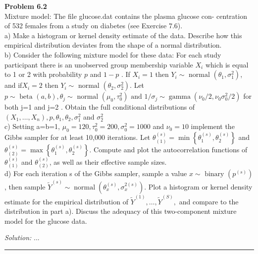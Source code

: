 \documentclass[a4paper, 11pt]{article}
\newenvironment{problem}[2][Problem]
    { \begin{mdframed}[backgroundcolor=gray!20] \textbf{#1 #2} \\}
    {  \end{mdframed}}
\newenvironment{solution}
    {\textit{Solution:}}
    {}
\begin{document}
\begin{problem}{6.2}
  Mixture model: The file glucose.dat contains the plasma glucose con- centration of 532 females from a study on diabetes (see Exercise 7.6).\\
  a) Make a histogram or kernel density estimate of the data. Describe how this empirical distribution deviates from the shape of a normal distribution.\\
  b) Consider the following mixture model for these data: For each study  participant there is an unobserved group membership variable $ X_{i}$   which is equal to  1  or  2 with probability $ p$ and $ 1-p$ . If $ X_{i}=1 $ then $ Y_{i} \sim \text { normal }\left(\theta_{1}, \sigma_{1}^{2}\right)$, and if$ X_{i}=2$  then $ Y_{i} \sim \text { normal }\left(\theta_{2}, \sigma_{2}^{2}\right) $. Let $  p \sim \text { beta }(a, b), \theta_{j} \sim \text { normal }\left(\mu_{0}, \tau_{0}^{2}\right) \text { and } 1 / \sigma_{j} \sim \operatorname{gamma}\left(\nu_{0} / 2, \nu_{0} \sigma_{0}^{2} / 2\right) $ for both  j=1 and  j=2 . Obtain the full conditional distributions of$ \left(X_{1}, \ldots, X_{n}\right), p, \theta_{1}, \theta_{2}, \sigma_{1}^{2} $ and $ \sigma_{2}^{2}$\\
  c) Setting  a=b=1, $\mu_{0}=120, \tau_{0}^{2}=200, \sigma_{0}^{2}=1000 $ and $ \nu_{0}=10 $  implement the Gibbs sampler for at least  10,000  iterations. Let $ \theta_{(1)}^{(s)}=\min \left\{\theta_{1}^{(s)}, \theta_{2}^{(s)}\right\}$  and $ \theta_{(2)}^{(s)}=\max \left\{\theta_{1}^{(s)}, \theta_{2}^{(s)}\right\} $.  Compute and plot the autocorrelation functions of $ \theta_{(1)}^{(s)} $ and $ \theta_{(2)}^{(s)}$,  as well as their effective  sample sizes. \\
  d) For each iteration  s of the Gibbs sampler, sample a value $ x \sim  \text { binary }\left(p^{(s)}\right)$,  then sample  $\tilde{Y}^{(s)} \sim \operatorname{normal}\left(\theta_{x}^{(s)}, \sigma_{x}^{2(s)}\right) $. Plot a histogram or kernel density estimate for the empirical distribution of $ \tilde{Y}^{(1)}, \ldots, \tilde{Y}^{(S)},$ and compare to the distribution in part a). Discuss  the adequacy of this two-component mixture model for the glucose data.
\end{problem}
\begin{solution}
...
\end{solution}

\noindent\rule{7in}{2.8pt}
\end{document}
